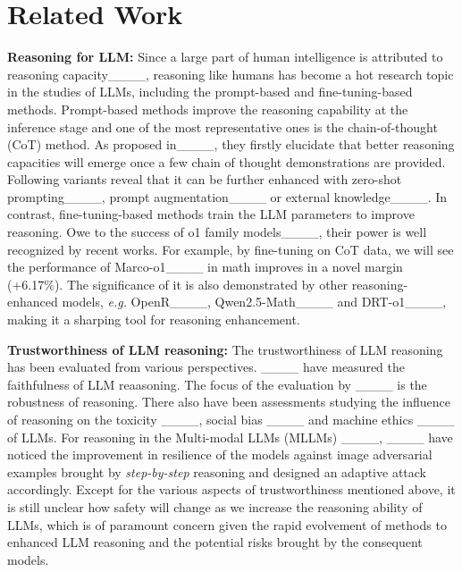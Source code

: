 \section{Related Work}
\label{sec::related_work}
\textbf{Reasoning for LLM: } Since a large part of human intelligence is attributed to reasoning capacity____, reasoning like humans has become a hot research topic in the studies of LLMs, including the prompt-based and fine-tuning-based methods. Prompt-based methods improve the reasoning capability at the inference stage and one of the most representative ones is the chain-of-thought (CoT) method. As proposed in____, they firstly elucidate that better reasoning capacities will emerge once a few chain of thought demonstrations are provided. Following variants reveal that it can be further enhanced with zero-shot prompting____, prompt augmentation____ or external knowledge____. In contrast, fine-tuning-based methods train the LLM parameters to improve reasoning. Owe to the success of o1 family models____, their power is well recognized by recent works. For example, by fine-tuning on CoT data, we will see the performance of Marco-o1____ in math improves in a novel margin (+6.17\%). The significance of it is also demonstrated by other reasoning-enhanced models, \textit{e.g.} OpenR____, Qwen2.5-Math____ and DRT-o1____, making it a sharping tool for reasoning enhancement.

\noindent\textbf{Trustworthiness of LLM reasoning: }The trustworthiness of LLM reasoning has been evaluated from various perspectives. ____ have measured the faithfulness of LLM reaasoning. The focus of the evaluation by ____ is the robustness of reasoning. There also have been assessments studying the influence of reasoning on the toxicity ____, social bias ____ and machine ethics ____ of LLMs. For reasoning in the Multi-modal LLMs (MLLMs) ____, ____ have noticed the improvement in resilience of the models against image adversarial examples brought by \textit{step-by-step} reasoning and designed an adaptive attack accordingly. Except for the various aspects of trustworthiness mentioned above, it is still unclear how safety will change as we increase the reasoning ability of LLMs, which is of paramount concern given the rapid evolvement of methods to enhanced LLM reasoning and the potential risks brought by the consequent models.